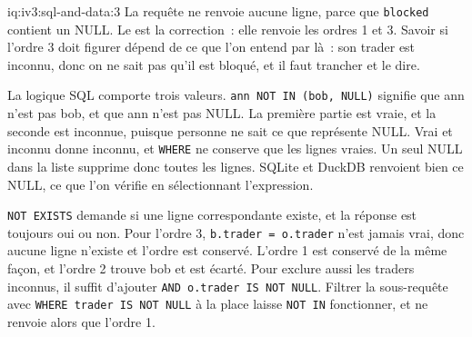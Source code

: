 \begin{solution}{iq:iv3:sql-and-data:3}
La requête ne renvoie aucune ligne, parce que \texttt{blocked} contient un NULL. Le  est la correction~: elle renvoie les ordres 1 et 3. Savoir si l'ordre 3 doit figurer dépend de ce que l'on entend par là~: son trader est inconnu, donc on ne sait pas qu'il est bloqué, et il faut trancher et le dire.
\label{lst:iv3:sq:notexists}

La logique SQL comporte trois valeurs. \texttt{\textquotesingle{}ann\textquotesingle{} NOT IN (\textquotesingle{}bob\textquotesingle{}, NULL)} signifie que ann n'est pas bob, et que ann n'est pas NULL. La première partie est vraie, et la seconde est inconnue, puisque personne ne sait ce que représente NULL. Vrai et inconnu donne inconnu, et \texttt{WHERE} ne conserve que les lignes vraies. Un seul NULL dans la liste supprime donc toutes les lignes. SQLite et DuckDB renvoient bien ce NULL, ce que l'on vérifie en sélectionnant l'expression.

\texttt{NOT EXISTS} demande si une ligne correspondante existe, et la réponse est toujours oui ou non. Pour l'ordre 3, \texttt{b.trader = o.trader} n'est jamais vrai, donc aucune ligne n'existe et l'ordre est conservé. L'ordre 1 est conservé de la même façon, et l'ordre 2 trouve bob et est écarté. Pour exclure aussi les traders inconnus, il suffit d'ajouter \texttt{AND o.trader IS NOT NULL}. Filtrer la sous-requête avec \texttt{WHERE trader IS NOT NULL} à la place laisse \texttt{NOT IN} fonctionner, et ne renvoie alors que l'ordre 1.

\end{solution}

